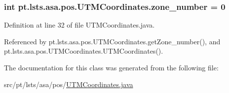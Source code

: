 \subsubsection[{zone\+\_\+number}]{\setlength{\rightskip}{0pt plus 5cm}int pt.\+lsts.\+asa.\+pos.\+U\+T\+M\+Coordinates.\+zone\+\_\+number = 0\hspace{0.3cm}{\ttfamily [private]}}\label{classpt_1_1lsts_1_1asa_1_1pos_1_1UTMCoordinates_a90bf03e81ee88041f7831e0b6a6bc08c}


Definition at line 32 of file U\+T\+M\+Coordinates.\+java.



Referenced by pt.\+lsts.\+asa.\+pos.\+U\+T\+M\+Coordinates.\+get\+Zone\+\_\+number(), and pt.\+lsts.\+asa.\+pos.\+U\+T\+M\+Coordinates.\+U\+T\+M\+Coordinates().



The documentation for this class was generated from the following file\+:\begin{DoxyCompactItemize}
\item 
src/pt/lsts/asa/pos/\hyperlink{UTMCoordinates_8java}{U\+T\+M\+Coordinates.\+java}\end{DoxyCompactItemize}
